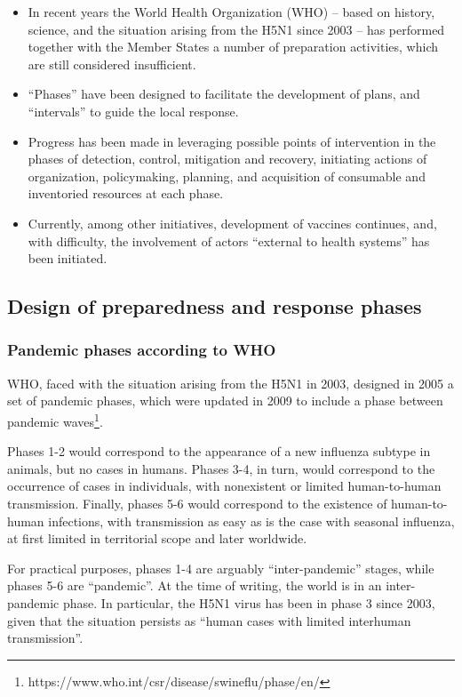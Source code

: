 \documentclass[12pt, a4]{scrartcl}
\begin{document}
\begin{mdframed}[leftmargin=10pt,rightmargin=10pt]
\begin{itemize}
	\item In recent years the World Health Organization (WHO) – based on history, science, and the situation arising from the H5N1 since 2003 – has performed together with the
Member States a number of preparation activities, which are still considered insufficient.
	\item “Phases” have been designed to facilitate the development of plans, and “intervals” to guide the local response.
	\item Progress has been made in leveraging possible points of intervention in the phases of detection, control, mitigation and recovery, initiating actions of organization, policymaking, planning, and acquisition of consumable and inventoried resources at each phase.
	\item Currently, among other initiatives, development of vaccines continues, and, with difficulty, the involvement of actors “external to health systems” has been initiated.
\end{itemize}
\end{mdframed}

\subsection{Design of preparedness and response phases}
\subsubsection{Pandemic phases according to WHO}
WHO, faced with the situation arising from the H5N1 in 2003, designed in 2005 a set of pandemic phases, which were updated in 2009 to include a phase between pandemic waves\footnote{https://www.who.int/csr/disease/swineflu/phase/en/}.

Phases 1-2 would correspond to the appearance of a new influenza subtype in animals, but no cases in humans. Phases 3-4, in turn, would correspond to the occurrence of cases in individuals, with nonexistent or limited human-to-human transmission. Finally, phases 5-6 would correspond to the existence of human-to-human infections, with transmission as easy as is the case with seasonal influenza, at first limited in territorial scope and later worldwide.

For practical purposes, phases 1-4 are arguably “inter-pandemic” stages, while phases 5-6 are “pandemic”. At the time of writing, the world is in an inter-pandemic phase. In particular, the H5N1 virus has been in phase 3 since 2003, given that the situation persists as “human cases with limited interhuman transmission”. 
\end{document}
